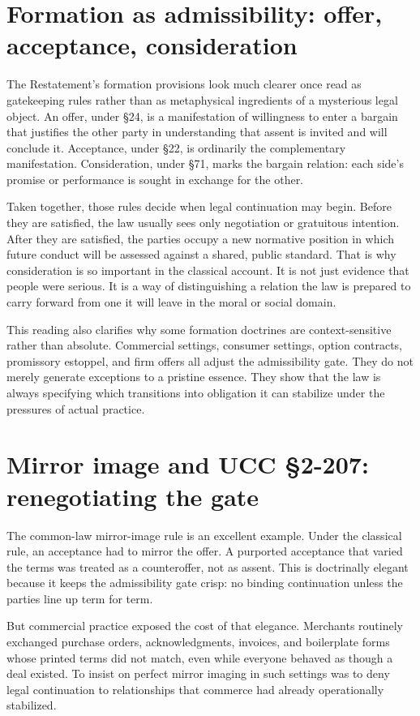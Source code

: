 \documentclass[11pt]{article}
\begin{document}
\section{Formation as admissibility: offer, acceptance, consideration}
The Restatement's formation provisions look much clearer once read as gatekeeping rules rather than as metaphysical ingredients of a mysterious legal object. An offer, under \S 24, is a manifestation of willingness to enter a bargain that justifies the other party in understanding that assent is invited and will conclude it. Acceptance, under \S 22, is ordinarily the complementary manifestation. Consideration, under \S 71, marks the bargain relation: each side's promise or performance is sought in exchange for the other.

Taken together, those rules decide when legal continuation may begin. Before they are satisfied, the law usually sees only negotiation or gratuitous intention. After they are satisfied, the parties occupy a new normative position in which future conduct will be assessed against a shared, public standard. That is why consideration is so important in the classical account. It is not just evidence that people were serious. It is a way of distinguishing a relation the law is prepared to carry forward from one it will leave in the moral or social domain.

This reading also clarifies why some formation doctrines are context-sensitive rather than absolute. Commercial settings, consumer settings, option contracts, promissory estoppel, and firm offers all adjust the admissibility gate. They do not merely generate exceptions to a pristine essence. They show that the law is always specifying which transitions into obligation it can stabilize under the pressures of actual practice.

\section{Mirror image and UCC \S 2-207: renegotiating the gate}
The common-law mirror-image rule is an excellent example. Under the classical rule, an acceptance had to mirror the offer. A purported acceptance that varied the terms was treated as a counteroffer, not as assent. This is doctrinally elegant because it keeps the admissibility gate crisp: no binding continuation unless the parties line up term for term.

But commercial practice exposed the cost of that elegance. Merchants routinely exchanged purchase orders, acknowledgments, invoices, and boilerplate forms whose printed terms did not match, even while everyone behaved as though a deal existed. To insist on perfect mirror imaging in such settings was to deny legal continuation to relationships that commerce had already operationally stabilized.
\end{document}
